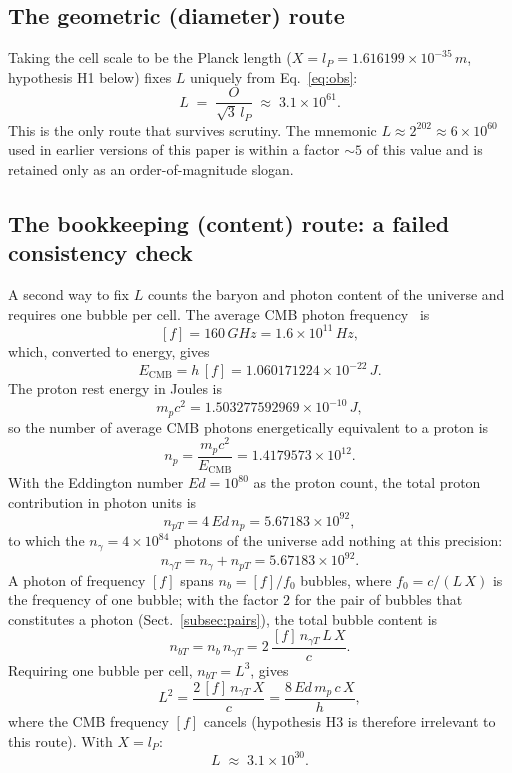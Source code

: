 \documentclass{ijuc}
\begin{document}
\subsection{The geometric (diameter) route}
Taking the cell scale to be the Planck length ($X=l_{P}=1.616199\times10^{-35}\,m$, hypothesis H1 below) fixes $L$ uniquely from Eq.~\eqref{eq:obs}:
\[
L \;=\; \frac{O}{\sqrt{3}\,l_{P}} \;\approx\; 3.1\times10^{61}.
\]
This is the only route that survives scrutiny.  The mnemonic $L\approx2^{202}\approx6\times10^{60}$ used in earlier versions of this paper is within a factor $\sim5$ of this value and is retained only as an order-of-magnitude slogan.

\subsection{The bookkeeping (content) route: a failed consistency check}
A second way to fix $L$ counts the baryon and photon content of the universe and requires one bubble per cell.  The average CMB photon frequency~\cite{archeops} is
\[
[f]=160\,GHz=1.6\times10^{11}\,Hz,
\]
which, converted to energy, gives
\[
E_{\mathrm{CMB}}=h\,[f]=1.060171224\times10^{-22}\,J.
\]
The proton rest energy in Joules is
\[
m_{p}c^{2}=1.503277592969\times10^{-10}\,J,
\]
so the number of average CMB photons energetically equivalent to a proton is
\[
n_{p}=\frac{m_{p}c^{2}}{E_{\mathrm{CMB}}}=1.4179573\times10^{12}.
\]
With the Eddington number $Ed=10^{80}$ as the proton count, the total proton contribution in photon units is
\[
n_{pT}=4\,Ed\,n_{p}=5.67183\times10^{92},
\]
to which the $n_{\gamma}=4\times10^{84}$ photons of the universe add nothing at this precision:
\[
n_{\gamma T}=n_{\gamma}+n_{pT}=5.67183\times10^{92}.
\]
A photon of frequency $[f]$ spans $n_{b}=[f]/f_{0}$ bubbles, where $f_{0}=c/(L\,X)$ is the frequency of one bubble; with the factor $2$ for the pair of bubbles that constitutes a photon (Sect.~\ref{subsec:pairs}), the total bubble content is
\[
n_{bT}=n_{b}\,n_{\gamma T}
=2\,\frac{[f]\,n_{\gamma T}\,L\,X}{c}.
\]
Requiring one bubble per cell, $n_{bT}=L^{3}$, gives
\[
L^{2}=\frac{2\,[f]\,n_{\gamma T}\,X}{c}
=\frac{8\,Ed\,m_{p}\,c\,X}{h},
\]
where the CMB frequency $[f]$ cancels (hypothesis H3 is therefore irrelevant to this route).  With $X=l_{P}$:
\[
L \;\approx\; 3.1\times10^{30}.
\]
\end{document}
